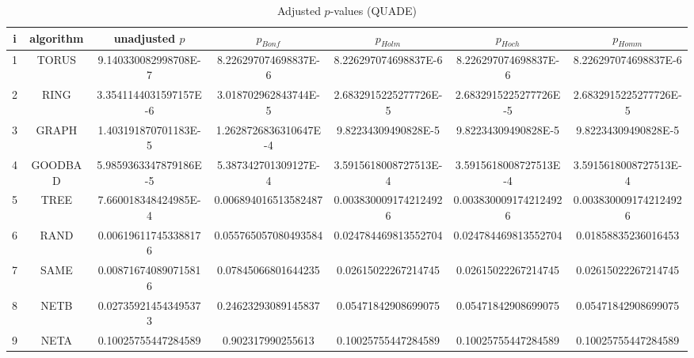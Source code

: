 \documentclass[a4paper,10pt]{article}
\begin{document}
\begin{landscape}
\begin{table}[!htp]
\centering\scriptsize
\caption{Adjusted $p$-values (QUADE)}
\begin{tabular}{ccccccc}
i&algorithm&unadjusted $p$&$p_{Bonf}$&$p_{Holm}$&$p_{Hoch}$&$p_{Homm}$\\
\hline
1& TORUS&9.140330082998708E-7&8.226297074698837E-6&8.226297074698837E-6&8.226297074698837E-6&8.226297074698837E-6\\
2& RING&3.3541144031597157E-6&3.018702962843744E-5&2.6832915225277726E-5&2.6832915225277726E-5&2.6832915225277726E-5\\
3& GRAPH&1.403191870701183E-5&1.2628726836310647E-4&9.82234309490828E-5&9.82234309490828E-5&9.82234309490828E-5\\
4& GOODBAD&5.9859363347879186E-5&5.387342701309127E-4&3.5915618008727513E-4&3.5915618008727513E-4&3.5915618008727513E-4\\
5& TREE&7.660018348424985E-4&0.006894016513582487&0.0038300091742124926&0.0038300091742124926&0.0038300091742124926\\
6& RAND&0.006196117453388176&0.055765057080493584&0.024784469813552704&0.024784469813552704&0.01858835236016453\\
7& SAME&0.008716740890715816&0.07845066801644235&0.02615022267214745&0.02615022267214745&0.02615022267214745\\
8& NETB&0.027359214543495373&0.24623293089145837&0.05471842908699075&0.05471842908699075&0.05471842908699075\\
9& NETA&0.10025755447284589&0.902317990255613&0.10025755447284589&0.10025755447284589&0.10025755447284589\\
\hline
\end{tabular}
\end{table}


\end{landscape}
\end{document}
